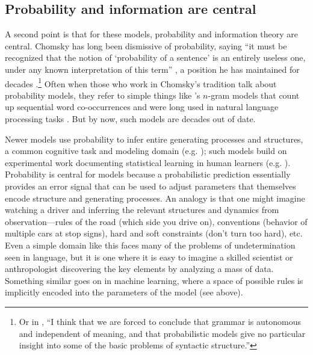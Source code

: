 \documentclass[output=paper,colorlinks,citecolor=brown
]{langscibook}
\begin{document}
\subsection*{Probability and information are central}

A second point is that for these models, probability and information theory are central. Chomsky has long been dismissive of probability, saying ``it must be recognized that the notion of ‘probability of a sentence’ is an entirely useless one, under any known interpretation of this term'' \citep{chomsky1969quine}, a position he has maintained for decades \citep{norvig2012colorless}.\footnote{Or in \cite{chomsky1957syntactic}, ``I think that we are forced to conclude that grammar is autonomous and independent of meaning, and that probabilistic models give no particular insight into some of the basic problems of syntactic structure.''} Often when those who work in Chomsky's 
tradition talk about probability models, they refer to simple things like \cite{shannon1948mathematical}'s $n$-gram models that count up sequential word co-occurrences and were long used in natural language processing tasks \citep{chen1999empirical,manning1999foundations}. But by now, such models are decades out of date. 

Newer models use probability to infer entire generating processes and structures, a common cognitive task and modeling domain (e.g. \cite{tenenbaum2011grow,ullman2012theory,lake2015human,goodman2011learning,lake2017building,rule2020child,kemp2008discovery,yang2022one}); such models build on experimental work documenting statistical learning in human learners (e.g. \cite{saffran1996statistical,saffran1996word,aslin1998computation,newport2004learning,aslin2012statistical}). Probability is central for models because a probabilistic prediction essentially provides an error signal that can be used to adjust parameters that themselves encode structure and  generating processes. An analogy is that one might imagine watching a driver and inferring the relevant structures and dynamics from observation---rules of the road (which side you drive on), conventions (behavior of multiple cars at stop signs), hard and soft constraints (don't turn too hard), etc. Even a simple domain like this faces many of the problems of undetermination seen in language, but it is one where it is easy to imagine a skilled scientist or anthropologist discovering the key elements by analyzing a mass of data. Something similar goes on in machine learning, where a space of possible rules is implicitly encoded into the parameters of the model (see above). %
\end{document}
